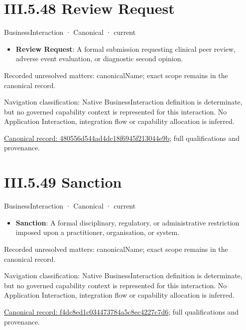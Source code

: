 \section*{III.5.48 Review Request}
\label{navigation:III.5.48}

\label{element:480556d544ad4dc18f6945f213044e9b}
{\small BusinessInteraction · Canonical · current}\par

\begin{itemize}


\item \textbf{Review Request}: A formal submission requesting clinical peer review, adverse event evaluation, or diagnostic second opinion.

\end{itemize}

{\small Recorded unresolved matters: canonicalName; exact scope remains in the canonical record.}\par
{\small Navigation classification: Native BusinessInteraction definition is determinate, but no governed capability context is represented for this interaction. No Application Interaction, integration flow or capability allocation is inferred.}\par
{\footnotesize \href{../../../../continuum/business/business-interaction/480556d544ad4dc18f6945f213044e9b.md}{Canonical record: 480556d544ad4dc18f6945f213044e9b}; full qualifications and provenance.}\par
\section*{III.5.49 Sanction}
\label{navigation:III.5.49}

\label{element:f4dc8ed1c034473784a5c8ec4227c7d6}
{\small BusinessInteraction · Canonical · current}\par

\begin{itemize}


\item \textbf{Sanction}: A formal disciplinary, regulatory, or administrative restriction imposed upon a practitioner, organisation, or system.

\end{itemize}

{\small Recorded unresolved matters: canonicalName; exact scope remains in the canonical record.}\par
{\small Navigation classification: Native BusinessInteraction definition is determinate, but no governed capability context is represented for this interaction. No Application Interaction, integration flow or capability allocation is inferred.}\par
{\footnotesize \href{../../../../continuum/business/business-interaction/f4dc8ed1c034473784a5c8ec4227c7d6.md}{Canonical record: f4dc8ed1c034473784a5c8ec4227c7d6}; full qualifications and provenance.}\par
